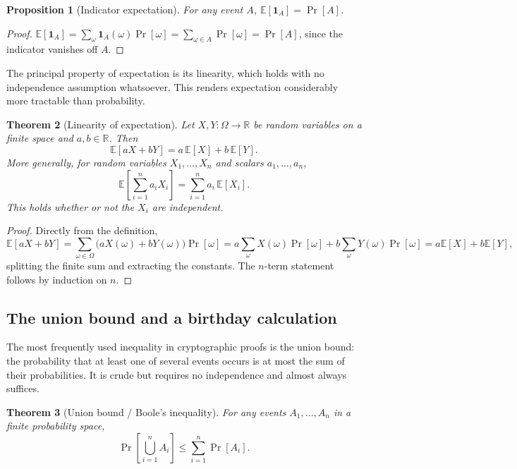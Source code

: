 \documentclass[11pt,a4paper]{article}
\newtheorem{theorem}{Theorem}[section]
\newtheorem{proposition}[theorem]{Proposition}
\theoremstyle{definition}
\theoremstyle{remark}
\newcommand{\R}{\ensuremath{\mathbb{R}}}
\newcommand{\E}{\ensuremath{\mathbb{E}}}
\begin{document}
\begin{proposition}[Indicator expectation]\label{probability:prop-indicator}
For any event \(A\), \(\E[\mathbf{1}_A] = \Pr[A]\).
\end{proposition}

\begin{proof}
\(\E[\mathbf{1}_A] = \sum_{\omega} \mathbf{1}_A(\omega)\Pr[\omega] = \sum_{\omega \in A} \Pr[\omega] = \Pr[A]\), since the indicator vanishes off \(A\).
\end{proof}

The principal property of expectation is its linearity, which holds with no independence assumption whatsoever. This renders expectation considerably more tractable than probability.

\begin{theorem}[Linearity of expectation]\label{probability:thm-linearity}
Let \(X, Y\colon \Omega \to \R\) be random variables on a finite space and \(a, b \in \R\). Then
\[
\E[aX + bY] = a\,\E[X] + b\,\E[Y].
\]
More generally, for random variables \(X_1, \dots, X_n\) and scalars \(a_1, \dots, a_n\),
\[
\E\!\left[\sum_{i=1}^n a_i X_i\right] = \sum_{i=1}^n a_i\,\E[X_i].
\]
This holds whether or not the \(X_i\) are independent.
\end{theorem}

\begin{proof}
Directly from the definition,
\[
\E[aX + bY] = \sum_{\omega \in \Omega} \big(aX(\omega) + bY(\omega)\big)\Pr[\omega]
= a\sum_{\omega} X(\omega)\Pr[\omega] + b\sum_{\omega} Y(\omega)\Pr[\omega] = a\E[X] + b\E[Y],
\]
splitting the finite sum and extracting the constants. The \(n\)-term statement follows by induction on \(n\).
\end{proof}

\subsection{The union bound and a birthday calculation}

The most frequently used inequality in cryptographic proofs is the union bound: the probability that at least one of several events occurs is at most the sum of their probabilities. It is crude but requires no independence and almost always suffices.

\begin{theorem}[Union bound / Boole's inequality]\label{probability:thm-union}
For any events \(A_1, \dots, A_n\) in a finite probability space,
\[
\Pr\!\left[\bigcup_{i=1}^n A_i\right] \le \sum_{i=1}^n \Pr[A_i].
\]
\end{theorem}
\end{document}
